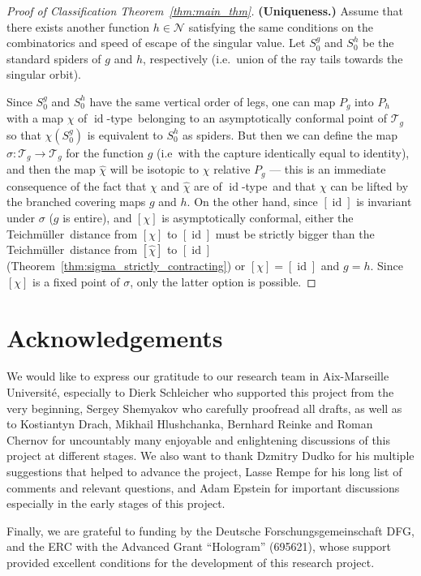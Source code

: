 \documentclass[10pt,reqno,a4paper]{amsart}
\numberwithin{figure}{section}
\numberwithin{equation}{section}
\newcommand{\tei}{Teichm\"uller}
\newcommand{\idt}{of $\id$-type}
\newcommand{\id}{\operatorname{id}}
\begin{document}
\begin{proof}[Proof of Classification Theorem~\ref{thm:main_thm}]
	\textbf{(Uniqueness.)} Assume that there exists another function $h\in\mathcal{N}$ satisfying the same conditions on the combinatorics and speed of escape of the singular value. Let $S_0^g$ and $S_0^h$ be the standard spiders of $g$ and $h$, respectively (i.e.\ union of the ray tails towards the singular orbit).
	
	Since $S_0^g$ and $S_0^h$ have the same vertical order of legs, one can map $P_g$ into $P_h$ with a map $\chi$ \idt\ belonging to an asymptotically conformal point of $\mathcal{T}_g$ so that $\chi(S_0^g)$ is equivalent to $S_0^h$ as spiders. But then we can define the map $\sigma:\mathcal{T}_g\to\mathcal{T}_g$ for the function $g$ (i.e\ with the capture identically equal to identity), and then the map $\hat{\chi}$ will be isotopic to $\chi$ relative $P_g$ --- this is an immediate consequence of the fact that $\chi$ and $\hat{\chi}$ are \idt\ and that $\chi$ can be lifted by the branched covering maps $g$ and $h$. On the other hand, since $[\id]$ is invariant under $\sigma$ ($g$ is entire), and $[\chi]$ is asymptotically conformal, either the \tei\ distance from $[\chi]$ to $[\id]$ must be strictly bigger than the \tei\ distance from $[\hat{\chi}]$ to $[\id]$ (Theorem~\ref{thm:sigma_strictly_contracting}) or $[\chi]=[\id]$ and $g=h$. Since $[\chi]$ is a fixed point of $\sigma$, only the latter option is possible. 
\end{proof}

\section{Acknowledgements}

We would like to express our gratitude to our research team in Aix-Marseille Universit\'e, especially to Dierk Schleicher who supported this project from the very beginning, Sergey Shemyakov who carefully proofread all drafts, as well as to  Kostiantyn Drach, Mikhail Hlushchanka, Bernhard Reinke and Roman Chernov for uncountably many enjoyable and enlightening discussions of this project at different stages. We also want to thank Dzmitry Dudko for his multiple suggestions that helped to advance the project, Lasse Rempe for his long list of comments and relevant questions, and Adam Epstein for important discussions especially in the early stages of this project. 

Finally, we are grateful to funding by the Deutsche Forschungsgemeinschaft DFG, and the ERC with the Advanced Grant “Hologram” (695621), whose support provided excellent conditions for the development of this research project.
\end{document}

